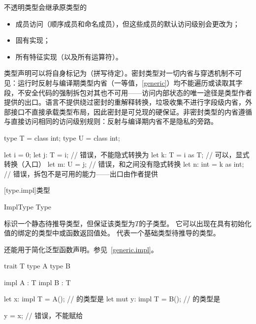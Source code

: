 \pnum
不透明类型会继承原类型的
\begin{itemize}
    \item 成员访问（顺序成员和命名成员），但这些成员的默认访问级别会更改为；
    \item 固有实现；
    \item 所有特征实现（以及所有运算符）。
\end{itemize}

\pnum
类型声明可以将自身标记为（拼写待定）。密封类型对一切内省与穿透机制不可见：运行时反射与编译期类型内省（一等值，\ref{generic}）均不能遍历或读取其字段，不安全代码的强制拆包对其也不可用——访问内部状态的唯一途径是类型作者提供的出口。语言不提供绕过密封的重解释转换，垃圾收集不进行字段级内省，外部接口不直接承载类型布局，因此密封是可兑现的硬保证。非密封类型的内省遵循与直接访问相同的访问级别规则：反射与编译期内省不是隐私的旁路。

\enterexample
\begin{codeblock}

type T = class int;
type U = class int;

let i = 0;
let j: T = i; // 错误，不能隐式转换为
let k: T = i as T; // 可以，显式转换（入口）
let m: U = j; // 错误，和之间没有隐式转换
let n: int = k as int; // 错误，拆包不是可用的能力——出口由作者提供

\end{codeblock}
\exitexample

[type.impl]{类型}

\begin{bnf}{ImplType}
     Type \br
     \terminal{_}
\end{bnf}

\pnum
{}标识一个静态待推导类型，但保证该类型为$T$的子类型。
它可以出现在具有初始化值的绑定的类型中或函数返回值处。
代表一个基础类型待推导的类型。

\pnum
{}还能用于简化泛型函数声明。参见~\ref{generic.impl}。

\enterexample
\begin{codeblock}

trait T { }
type A { }
type B { }

impl A : T { }
impl B : T { }

let x: impl T = A(); // 的类型是
let mut y: impl T = B(); // 的类型是

y = x; // 错误，不能赋给

\end{codeblock}
\exitexample

